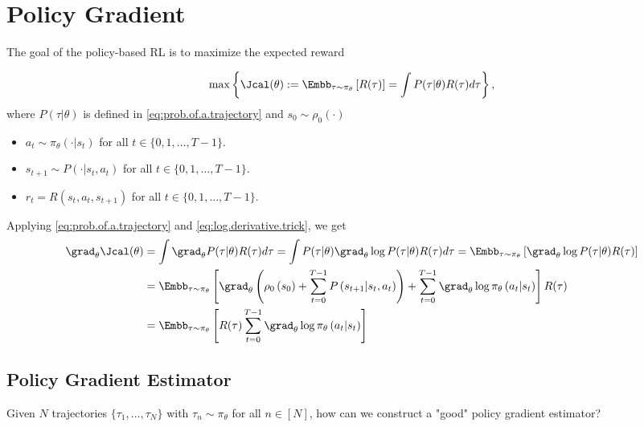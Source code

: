 \section{Policy Gradient}

The goal of the policy-based RL is to maximize the expected reward 

\begin{align}
    \max \left\{\Jcal(\theta):= \Embb_{\tau\sim \pi_{\theta}}\left[ R(\tau)\right] = \int P(\tau|\theta)R(\tau) d\tau\right\},
\end{align}
where $P(\tau|\theta)$ is defined in \eqref{eq:prob.of.a.trajectory} and $s_0\sim \rho_0(\cdot)$
\begin{itemize}
    \item $a_t\sim \pi_{\theta}(\cdot | s_t)$ for all $t\in \{0, 1, \ldots, T-1\}$.
    \item $s_{t+1} \sim P(\cdot | s_t, a_t)$ for all $t\in \{0, 1, \ldots, T-1\}$.
    \item $r_t=R(s_t,a_t, s_{t+1})$ for all $t\in \{0, 1, \ldots, T-1\}$.
\end{itemize}

Applying \eqref{eq:prob.of.a.trajectory} and \eqref{eq:log.derivative.trick}, we get 
\begin{align}
    \grad_{\theta} \Jcal(\theta) 
    & = \int \grad_{\theta} P(\tau|\theta)R(\tau) d\tau = \int  P(\tau|\theta) \grad_{\theta}\log  P(\tau|\theta)R(\tau) d\tau = \Embb_{\tau\sim \pi_{\theta}}\left[ \grad_{\theta}\log P(\tau|\theta)R(\tau)\right] \nonumber\\
    & = \Embb_{\tau\sim \pi_{\theta}}\left[ \grad_{\theta}\left(\rho_0\left(s_0\right) + \sum_{t=0}^{T-1} P\left(s_{t+1} | s_t, a_t\right)\right) + \sum_{t=0}^{T-1}\grad_{\theta} \log \pi_\theta\left(a_t | s_t\right)\right] R(\tau) \nonumber\\
    & = \Embb_{\tau\sim \pi_{\theta}}\left[ R(\tau) \sum_{t=0}^{T-1}\grad_{\theta} \log \pi_\theta\left(a_t | s_t\right)\right] \label{eq:policy.grad}
\end{align}



\subsection{Policy Gradient Estimator}

Given $N$ trajectories $\{\tau_1, \ldots, \tau_N\}$ with $\tau_n\sim \pi_{\theta}$ for all $n\in [N]$, how can we construct a "good" policy gradient estimator?

